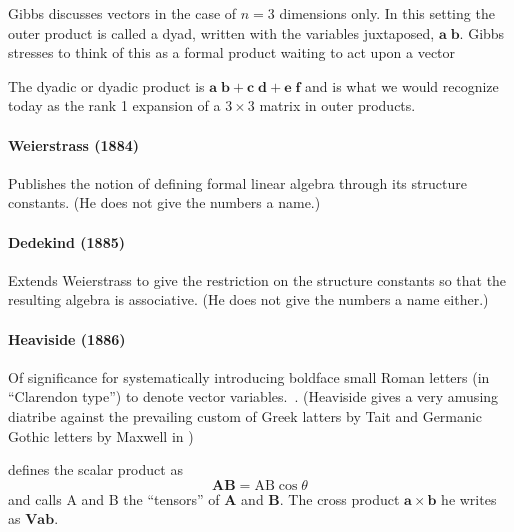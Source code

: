 Gibbs discusses vectors in the case of $n=3$ dimensions only. In this setting the outer product is called a dyad, written with the variables juxtaposed, $\mathbf{ a \; b }$.
Gibbs stresses to think of this as a formal product waiting to act upon a vector

The dyadic or dyadic product is $\mathbf{ a \; b } + \mathbf{ c \; d } + \mathbf{ e \; f }$ and is what we would recognize today as the rank 1 expansion of a $3 \times 3$ matrix in outer products.




\paragraph{Weierstrass (1884)~\cite{Weierstrass1884}}

Publishes the notion of defining formal linear algebra through its structure constants. (He does not give the numbers a name.)



\paragraph{Dedekind (1885)~\cite{Dedekind1885}}

Extends Weierstrass to give the restriction on the structure constants so that the resulting algebra is associative. (He does not give the numbers a name either.)



\paragraph{Heaviside (1886)~\cite{Heaviside1886}}

Of significance for systematically introducing boldface small Roman letters (in ``Clarendon type'') to denote vector variables.~\cite{Heaviside1886}. (Heaviside gives a very amusing diatribe against the prevailing custom of Greek latters by Tait and Germanic Gothic letters by Maxwell in \cite[\S 103, pp. 139-142]{Heaviside1894})


\cite[\S 107]{Heaviside1894} defines the scalar product as
\[
\mathbf{AB} = \mathrm{AB} \cos \theta
\]
and calls A and B the ``tensors'' of $\mathbf{A}$ and $\mathbf{B}$. The cross product $\mathbf a \times \mathbf b$ he writes as $\mathbf{V a b}$.

